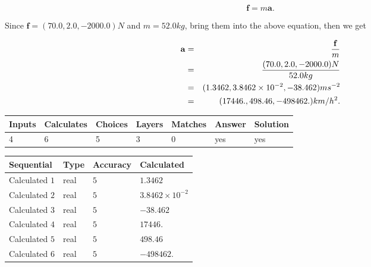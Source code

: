 \documentclass[12pt]{article}
\begin{document}
\[
\mathbf{f}=m\mathbf{a}.
\]
 
Since $\mathbf{f}=( %
70.0,  %
2.0,  %
-2000.0 )N$
and $m= %
52.0kg$, bring them into the above equation, then we get
 
\begin{eqnarray*}
\mathbf{a}&=&\frac{\mathbf{f}}m  \\
&=&\frac{(
70.0 ,
2.0 ,
-2000.0 )N
}{ %
52.0 kg}  \\
&=&(
1.3462 ,
3.8462 \times 10^{-2},
-38.462
)ms^{-2} \\
&=&(
17446. ,
498.46 ,
-498462.
)km/h^2.
\end{eqnarray*}
 
 
 
\noindent{}
 
 

 
\vspace{0.3in}
   
   
   
   
\noindent\begin{tabular}{|l|l|l|l|l|l|l|}
 \hline
Inputs & Calculates & Choices & Layers & Matches & Answer & Solution \\ \hline
           4 & 
           6 & 
           5
  & 
           3 & 
           0 & 
  yes & 
  yes 
  \\ \hline
 \end{tabular}
   
   
   
   
\noindent{}
   
   
  
  
\noindent\begin{tabular}{|l|l|l|l|}
\hline
 Sequential & Type & Accuracy & Calculated \\ 
\hline
 
 
  Calculated $           1$ & real & $           5 $ & 
 $ 1.3462 $ 
 \\  \hline  
 
 
  Calculated $           2$ & real & $           5 $ & 
 $ 3.8462 \times 10^{-2} $ 
 \\  \hline  
 
 
  Calculated $           3$ & real & $           5 $ & 
 $ -38.462 $ 
 \\  \hline  
 
 
  Calculated $           4$ & real & $           5 $ & 
 $ 17446. $ 
 \\  \hline  
 
 
  Calculated $           5$ & real & $           5 $ & 
 $ 498.46 $ 
 \\  \hline  
 
 
  Calculated $           6$ & real & $           5 $ & 
 $ -498462. $ 
 \\  \hline  
 \end{tabular}
   
\end{document}
